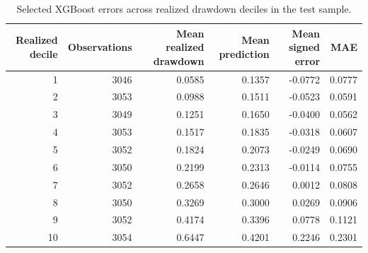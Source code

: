 \begin{table}
\caption{Selected XGBoost errors across realized drawdown deciles in the test sample.}
\label{tab:xgboost-error-by-realized-decile}
\begin{tabular}{rrrrrr}
\toprule
Realized decile & Observations & Mean realized drawdown & Mean prediction & Mean signed error & MAE \\
\midrule
1 & 3046 & 0.0585 & 0.1357 & -0.0772 & 0.0777 \\
2 & 3053 & 0.0988 & 0.1511 & -0.0523 & 0.0591 \\
3 & 3049 & 0.1251 & 0.1650 & -0.0400 & 0.0562 \\
4 & 3053 & 0.1517 & 0.1835 & -0.0318 & 0.0607 \\
5 & 3052 & 0.1824 & 0.2073 & -0.0249 & 0.0690 \\
6 & 3050 & 0.2199 & 0.2313 & -0.0114 & 0.0755 \\
7 & 3052 & 0.2658 & 0.2646 & 0.0012 & 0.0808 \\
8 & 3050 & 0.3269 & 0.3000 & 0.0269 & 0.0906 \\
9 & 3052 & 0.4174 & 0.3396 & 0.0778 & 0.1121 \\
10 & 3054 & 0.6447 & 0.4201 & 0.2246 & 0.2301 \\
\bottomrule
\end{tabular}
\end{table}
